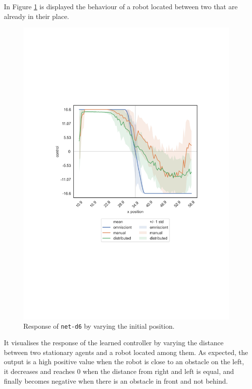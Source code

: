 In Figure \ref{fig:net-d6responseposition} is displayed the behaviour of a robot 
located between two that are already in their place.
\begin{figure}[!htb]
	\centering
	\includegraphics[width=.45\textwidth]{contents/images/net-d6/response-varying_init_position-distributed}%
	\caption{Response of \texttt{net-d6} by varying the initial position.}
	\label{fig:net-d6responseposition}
\end{figure}
It visualises the response of the learned controller by varying the distance 
between two stationary agents and a robot located among them.
As expected, the output is a high positive value when the robot is close to an 
obstacle on the left, it decreases and reaches $0$ when the distance from 
right and left is equal, and finally becomes negative when there is an obstacle in 
front and not behind. 

